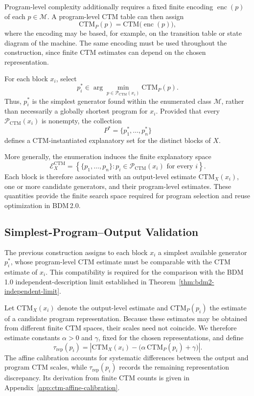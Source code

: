 \documentclass{article}
\begin{document}
Program-level complexity additionally requires a fixed finite encoding \(\operatorname{enc}(p)\) of each \(p\in\mathcal M\). A program-level CTM table can then assign
\[
\mathrm{CTM}_P(p)
=
\mathrm{CTM}\bigl(\operatorname{enc}(p)\bigr),
\]
where the encoding may be based, for example, on the transition table or state diagram of the machine. The same encoding must be used throughout the construction, since finite CTM estimates can depend on the chosen representation.

For each block \(x_i\), select
\[
p_i^*
\in
\arg\min_{p\in\mathcal P_{\mathrm{CTM}}(x_i)}
\mathrm{CTM}_P(p).
\]
Thus, \(p_i^*\) is the simplest generator found within the enumerated class \(\mathcal M\), rather than necessarily a globally shortest program for \(x_i\). Provided that every \(\mathcal P_{\mathrm{CTM}}(x_i)\) is nonempty, the collection
\[
P^*
=
\{p_1^*,\ldots,p_n^*\}
\]
defines a CTM-instantiated explanatory set for the distinct blocks of \(X\).

More generally, the enumeration induces the finite explanatory space
\[
\mathcal E_X^{\mathrm{CTM}}
=
\left\{
\{p_1,\ldots,p_n\}:
p_i\in\mathcal P_{\mathrm{CTM}}(x_i)
\text{ for every }i
\right\}.
\]
Each block is therefore associated with an output-level estimate \(\mathrm{CTM}_X(x_i)\), one or more candidate generators, and their program-level estimates. These quantities provide the finite search space required for program selection and reuse optimization in BDM\,2.0.


\subsection{Simplest-Program--Output Validation}
\label{sec:simplest-program-output-validation}

The previous construction assigns to each block \(x_i\) a simplest available generator \(p_i^*\), whose program-level CTM estimate must be comparable with the CTM estimate of \(x_i\). This compatibility is required for the comparison with the BDM\,1.0 independent-description limit established in Theorem~\ref{thm:bdm2-independent-limit}.

Let \(\mathrm{CTM}_X(x_i)\) denote the output-level estimate and \(\mathrm{CTM}_P(p_i)\) the estimate of a candidate program representation. Because these estimates may be obtained from different finite CTM spaces, their scales need not coincide. We therefore estimate constants \(\alpha>0\) and \(\gamma\), fixed for the chosen representations, and define
\[
\tau_{\mathrm{rep}}(p_i)
=
\left|
\mathrm{CTM}_X(x_i)
-
\bigl(\alpha\,\mathrm{CTM}_P(p_i)+\gamma\bigr)
\right|.
\]
The affine calibration accounts for systematic differences between the output and program CTM scales, while \(\tau_{\mathrm{rep}}(p_i)\) records the remaining representation discrepancy. Its derivation from finite CTM counts is given in Appendix~\ref{app:ctm-affine-calibration}.
\end{document}
